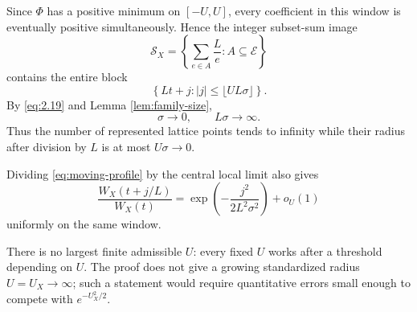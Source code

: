 Since $\Phi$ has a positive minimum on $[-U,U]$, every coefficient in this window is eventually positive simultaneously. Hence the integer subset-sum image
\[
\mathcal S_X
=
\left\{\sum_{e\in A}\frac{L}{e}:A\subseteq\mathcal E\right\}
\tag{8.16}\label{eq:8.16}
\]
contains the entire block
\[
\left\{Lt+j:
|j|\le\lfloor UL\sigma\rfloor\right\}.
\tag{8.17}\label{eq:8.17}
\]
By \eqref{eq:2.19} and Lemma \ref{lem:family-size},
\[
\sigma\to0,
\qquad
L\sigma\to\infty.
\tag{8.18}\label{eq:8.18}
\]
Thus the number of represented lattice points tends to infinity while their radius after division by $L$ is at most $U\sigma\to0$.

Dividing \eqref{eq:moving-profile} by the central local limit also gives
\[
\frac{W_X(t+j/L)}{W_X(t)}
=
\exp\left(-\frac{j^2}{2L^2\sigma^2}\right)+o_U(1)
\tag{8.19}\label{eq:8.19}
\]
uniformly on the same window.

\begin{remark}
There is no largest finite admissible $U$: every fixed $U$ works after a threshold depending on $U$. The proof does not give a growing standardized radius $U=U_X\to\infty$; such a statement would require quantitative errors small enough to compete with $e^{-U_X^2/2}$.
\end{remark}
